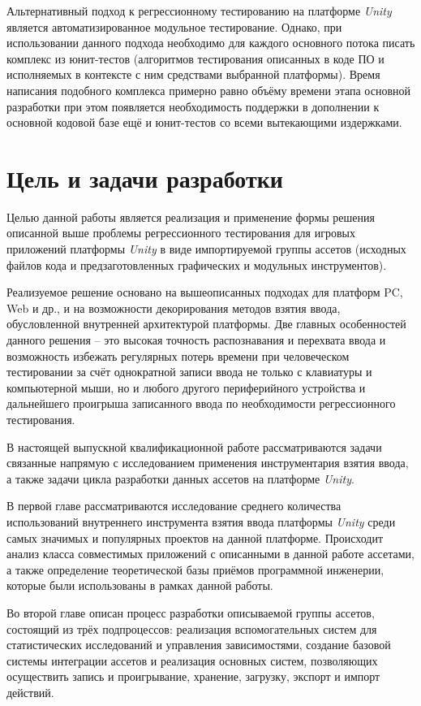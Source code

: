 Альтернативный подход к регрессионному тестированию на платформе \textit{Unity} является автоматизированное модульное тестирование. Однако, при использовании данного подхода необходимо для каждого основного потока писать комплекс из юнит-тестов (алгоритмов тестирования описанных в коде ПО и исполняемых в контексте с ним средствами выбранной платформы). Время написания подобного комплекса примерно равно объёму времени этапа основной разработки при этом появляется необходимость поддержки в дополнении к основной кодовой базе ещё и юнит-тестов со всеми вытекающими издержками.

\section*{Цель и задачи разработки}
Целью данной работы является реализация и применение формы решения описанной выше проблемы регрессионного тестирования для игровых приложений платформы \textit{Unity} в виде импортируемой группы ассетов (исходных файлов кода и предзаготовленных графических и модульных инструментов). 

Реализуемое решение основано на вышеописанных подходах для платформ PC, Web и др., и на возможности декорирования методов взятия ввода, обусловленной внутренней архитектурой платформы. Две главных особенностей данного решения -- это высокая точность распознавания и перехвата ввода и возможность избежать регулярных потерь времени при человеческом тестировании за счёт однократной записи ввода не только с клавиатуры и компьютерной мыши, но и любого другого периферийного устройства и дальнейшего проигрыша записанного ввода по необходимости регрессионного тестирования.

В настоящей выпускной квалификационной работе рассматриваются задачи связанные напрямую с исследованием применения инструментария взятия ввода, а также задачи цикла разработки данных ассетов на платформе \textit{Unity}.

В первой главе рассматриваются исследование среднего количества использований внутреннего инструмента взятия ввода платформы \textit{Unity} среди самых значимых и популярных проектов на данной платформе. Происходит анализ класса совместимых приложений с описанными в данной работе ассетами, а также определение теоретической базы приёмов программной инженерии, которые были использованы в рамках данной работы.

Во второй главе описан процесс разработки описываемой группы ассетов, состоящий из трёх подпроцессов: реализация вспомогательных систем для статистических исследований и управления зависимостями, создание базовой системы интеграции ассетов и реализация основных систем, позволяющих осуществить запись и проигрывание, хранение, загрузку, экспорт и импорт действий.

